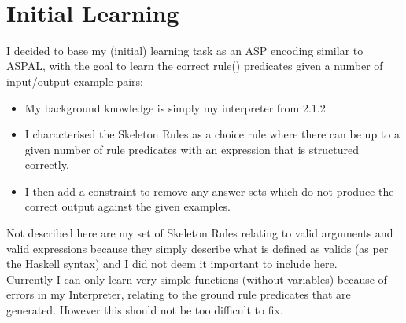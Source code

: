 
\mbox{} \\

\section{Initial Learning}

I decided to base my (initial) learning task as an ASP encoding similar to ASPAL, with the goal to learn the correct rule() predicates given a number of input/output example pairs:

\begin{itemize}
\item My background knowledge is simply my interpreter from 2.1.2
\item I characterised the Skeleton Rules as a choice rule where there can be up to a given number of rule predicates with an expression that is structured correctly. 

\item I then add a constraint to remove any answer sets which do not produce the correct output against the given examples.

\end{itemize}

Not described here are my set of Skeleton Rules relating to valid arguments and valid expressions because they simply describe what is defined as valids (as per the Haskell syntax) and I did not deem it important to include here.\\

Currently I can only learn very simple functions (without variables) because of errors in my Interpreter, relating to the ground rule predicates that are generated. However this should not be too difficult to fix. 

\pagebreak
%
%